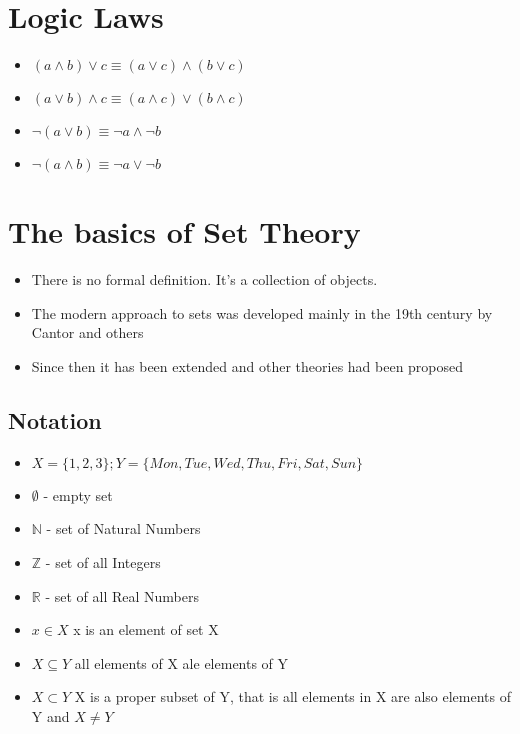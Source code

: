 \documentclass{article}
\begin{document}
\section{Logic Laws}
\begin{itemize}
	\item $(a \land b) \lor c \equiv (a \lor c) \land (b \lor c)$
	\item $(a \lor b) \land c \equiv (a \land c) \lor (b \land c)$
	\item $\lnot (a \lor b) \equiv \lnot a \land \lnot b$
	\item $\lnot (a \land b) \equiv \lnot a \lor \lnot b$
\end{itemize}
\section{The basics of Set Theory}
\begin{itemize}
	\item There is no formal definition. It's a collection of objects.
	\item The modern approach to sets was developed mainly in the 19th century by Cantor and others
	\item Since then it has been extended and other theories had been proposed
\end{itemize}
\subsection{Notation}
\begin{itemize}
	\item $X = \{1, 2, 3\}; Y=\{Mon, Tue, Wed, Thu, Fri, Sat, Sun\}$
	\item $\emptyset$ - empty set
	\item $\mathbb{N}$ - set of Natural Numbers
	\item $\mathbb{Z}$ - set of all Integers
	\item $\mathbb{R}$ - set of all Real Numbers
	\item $x \in X$ x is an element of set X
	\item $X \subseteq Y$ all elements of X ale elements of Y
	\item $X \subset Y$ X is a proper subset of Y, that is all elements in X are also elements of Y and $X \neq Y$
\end{itemize}
\end{document}
